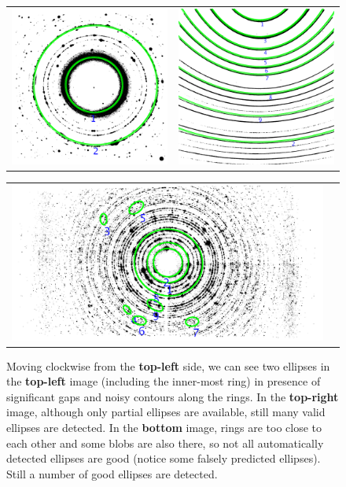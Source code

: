\documentclass[preprint]{iucr}              %
\begin{document}
\begin{figure}
\begin{tabular}{cc}

\includegraphics[width=.45\linewidth,height=.45\textheight,keepaspectratio]{Ranked/o_Si12_0002__Ranked.png}&
\includegraphics[width=.45\linewidth,height=.45\textheight,keepaspectratio]{Ranked/o_tilted_002__Ranked.png}
\end{tabular}

\begin{tabular}{cc}
\includegraphics[width=.95\linewidth,keepaspectratio]{Ranked/o_LaB6_0021__Ranked.png}
\end{tabular}

\label{fig:result1}
\caption {Moving clockwise from the \textbf{top-left} side, we can see two ellipses in the \textbf{top-left} image (including the inner-most ring) in presence of significant gaps and noisy contours along the rings. In the \textbf{top-right} image, although only partial ellipses are available, still many valid ellipses are detected. In the \textbf{bottom} image, rings are too close to each other and some blobs are also there, so not all automatically detected ellipses are good (notice some falsely predicted ellipses). Still a number of good ellipses are detected.}
\end{figure}
\end{document}

